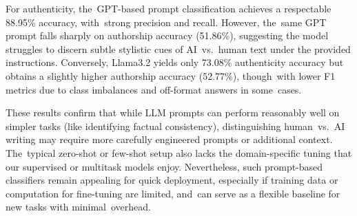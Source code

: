 \documentclass[electronics,article,accept,pdftex,moreauthors,electronics]{Definitions/mdpi}
\begin{document}
\begin{table}[H]
\tablesize{\small}
\caption{\hl{The performance} %
 of prompt-based LLM classifiers on authenticity (fake~vs.~real) and authorship (human~vs.~AI). The~prompts supply each article’s \{title\} and \{text\}, and~the LLM outputs a single~label.}
\label{tab:prompt_results}
\end{table}



For authenticity, the~GPT-based prompt classification achieves a respectable 88.95\% accuracy, with~strong precision and recall. However, the~same GPT prompt falls sharply on authorship accuracy (51.86\%), suggesting the model struggles to discern subtle stylistic cues of AI~vs.~human text under the provided instructions. Conversely, Llama3.2 yields only 73.08\% authenticity accuracy but obtains a slightly higher authorship accuracy (52.77\%), though~with lower F1 metrics due to class imbalances and off-format answers in some~cases.



These results confirm that while LLM prompts can perform reasonably well on simpler tasks (like identifying factual consistency), distinguishing human~vs.~AI writing may require more carefully engineered prompts or additional context. The~typical zero-shot or few-shot setup also lacks the domain-specific tuning that our supervised or multitask models enjoy. Nevertheless, such prompt-based classifiers remain appealing for quick deployment, especially if training data or computation for fine-tuning are limited, and~can serve as a flexible baseline for new tasks with minimal~overhead.
\end{document}
